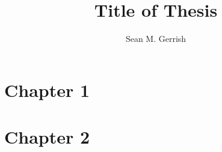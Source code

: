 \documentclass[12pt]{puthesis}
\title{Title of Thesis}
\author{Sean M. Gerrish}
\begin{document}
\chapter{Chapter 1}  %

\chapter{Chapter 2}  %


\end{document}
